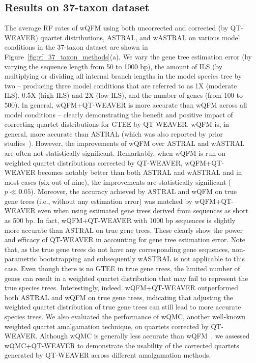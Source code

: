 \documentclass[runningheads]{llncs}
\newcommand{\add}[1]{{\color{blue} #1}}
\begin{document}
\subsection{Results on 37-taxon dataset}
The average RF rates of wQFM using both uncorrected and corrected (by QT-WEAVER) quartet distributions, ASTRAL, \add{and wASTRAL} on various model conditions in the 37-taxon dataset are shown in Figure~\ref{fig:rf_37_taxon_methods}(a). %
We vary the gene tree estimation error (by varying the sequence length from 50 to 1000 bp), the amount of ILS (by multiplying or dividing all internal branch lengths in the model species tree by two -- producing three model conditions that are referred to as 1X (moderate ILS), 0.5X (high ILS) and 2X (low ILS), and the number of genes (from 100 to 500). In general, wQFM+QT-WEAVER is more accurate than wQFM across all model conditions -- clearly demonstrating the benefit and positive impact of correcting quartet distributions for GTEE by QT-WEAVER. wQFM is, in general, more accurate than ASTRAL (which was also reported by prior studies~\cite{wqfm,mahbub2022qt}). However, the improvements of wQFM over ASTRAL and wASTRAL are often not statistically significant. Remarkably, when wQFM is run on weighted quartet distributions corrected by QT-WEAVER, wQFM+QT-WEAVER becomes notably better than both ASTRAL and wASTRAL and in most cases (six out of nine), the improvements are statistically significant ($p \ll 0.05$). Moreover, the accuracy achieved by ASTRAL and wQFM on true gene trees (i.e., without any estimation error) was matched by wQFM+QT-WEAVER even when using estimated gene trees derived from sequences as short as 500 bp. In fact, wQFM+QT-WEAVER with 1000 bp sequences is slightly more accurate than ASTRAL on true gene trees. These clearly show the power and efficacy of QT-WEAVER in accounting for gene tree estimation error. %
\add{Note that, as the true gene trees do not have any corresponding gene sequences, non-parametric bootstrapping and subsequently wASTRAL is not applicable to this case.}
Even though there is no GTEE in true gene trees, the limited number of genes can result in a weighted quartet distribution that may fail to represent the true species trees. 
Interestingly, indeed, wQFM+QT-WEAVER outperformed both ASTRAL and wQFM on true gene trees, indicating that adjusting the weighted quartet distribution of true gene trees can still lead to more accurate species trees. We also evaluated the performance of wQMC, another well-known weighted quartet amalgamation technique, on quartets corrected by QT-WEAVER. Although wQMC is generally less accurate than wQFM~\cite{wqfm,mahbub2022qt}, we assessed wQMC+QT-WEAVER to demonstrate the usability of the corrected quartets generated by QT-WEAVER across different amalgamation methods. %
\end{document}
